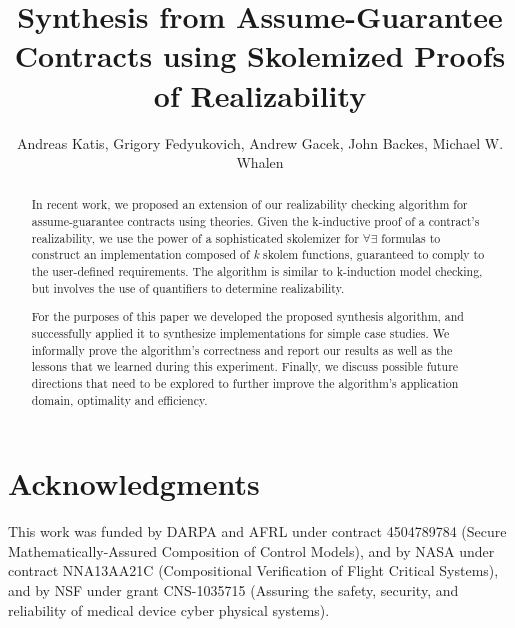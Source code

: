 \documentclass[orivec]{llncs}
\begin{document}
\title{Synthesis from Assume-Guarantee Contracts using Skolemized Proofs of
Realizability}
\author{Andreas Katis, Grigory Fedyukovich, Andrew
Gacek, John Backes, Michael W. Whalen}%
\maketitle

\begin{abstract}
In recent work, we proposed an extension of our realizability checking algorithm
for assume-guarantee contracts using theories. Given the k-inductive proof of a
contract's realizability, we use the power of a sophisticated skolemizer for
$\forall\exists$ formulas to construct an implementation composed of \textit{k}
skolem functions, guaranteed to comply to the user-defined requirements.
The algorithm is similar to k-induction model checking, but involves the use of 
quantifiers to determine realizability.

For the purposes of this paper we developed the proposed synthesis algorithm,
and successfully applied it to synthesize implementations for simple case
studies. We informally prove the algorithm's correctness and report our results
as well as the lessons that we learned during this experiment. Finally, we
discuss possible future directions that need to be explored to further improve the algorithm's application domain, optimality and efficiency.
\end{abstract}









\section*{Acknowledgments}
This work was funded by DARPA and AFRL under contract 4504789784 (Secure Mathematically-Assured Composition of Control Models), and by NASA under contract NNA13AA21C (Compositional Verification of Flight Critical Systems), and by NSF under grant CNS-1035715 (Assuring the safety, security, and reliability of medical device cyber physical systems).


\end{document}
